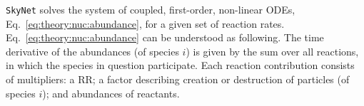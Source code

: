 \texttt{SkyNet} solves the system of coupled, first-order, non-linear \acp{ODE}, 
Eq.~\eqref{eq:theory:nuc:abundance}, for a given set of reaction rates.  %
Eq.~\eqref{eq:theory:nuc:abundance} can be understood as following. 
The time derivative of the abundances (of species $i$) is given by the sum over all reactions, 
in which the species in question participate. Each reaction contribution consists of multipliers: 
a \ac{RR}; a factor describing creation or destruction of particles (of species $i$); 
and abundances of reactants. 
%
%
%
%
